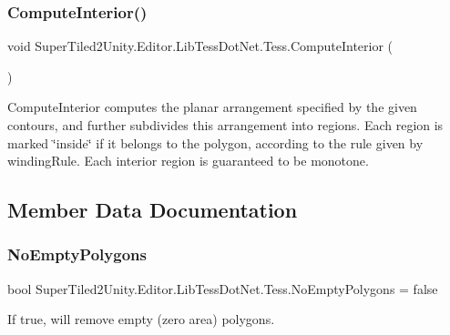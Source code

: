 \subsubsection{\texorpdfstring{Compute\+Interior()}{ComputeInterior()}}
{\footnotesize\ttfamily void Super\+Tiled2\+Unity.\+Editor.\+Lib\+Tess\+Dot\+Net.\+Tess.\+Compute\+Interior (\begin{DoxyParamCaption}{ }\end{DoxyParamCaption})\hspace{0.3cm}{\ttfamily [protected]}}



Compute\+Interior computes the planar arrangement specified by the given contours, and further subdivides this arrangement into regions. Each region is marked \char`\"{}inside\char`\"{} if it belongs to the polygon, according to the rule given by winding\+Rule. Each interior region is guaranteed to be monotone. 



\subsection{Member Data Documentation}
\mbox{\label{class_super_tiled2_unity_1_1_editor_1_1_lib_tess_dot_net_1_1_tess_a1b947d7d13dfc58a8848e4c8420ab62d}} 
\subsubsection{\texorpdfstring{No\+Empty\+Polygons}{NoEmptyPolygons}}
{\footnotesize\ttfamily bool Super\+Tiled2\+Unity.\+Editor.\+Lib\+Tess\+Dot\+Net.\+Tess.\+No\+Empty\+Polygons = false}



If true, will remove empty (zero area) polygons. 

\mbox{\label{class_super_tiled2_unity_1_1_editor_1_1_lib_tess_dot_net_1_1_tess_ae1a04c8eb8585a734a74f6c00b7e2e20}} 

